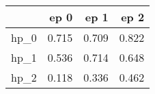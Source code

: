 \begin{tabular}{lrrr}
\toprule
{} &   ep 0 &   ep 1 &   ep 2 \\
\midrule
hp\_0 &  0.715 &  0.709 &  0.822 \\
hp\_1 &  0.536 &  0.714 &  0.648 \\
hp\_2 &  0.118 &  0.336 &  0.462 \\
\bottomrule
\end{tabular}
